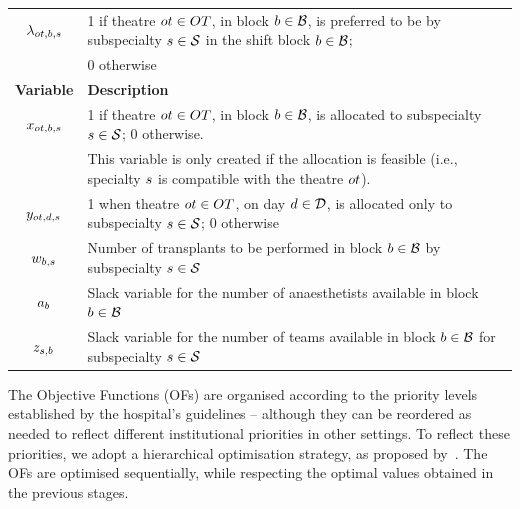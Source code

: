\begin{table}[t!]
\begin{tabular}{cl}
        $\lambda_{ot,b,s}$   & 1 if theatre $ot \in OT$, in block $b \in \mathcal{B}$, is preferred to be by subspecialty $s \in \mathcal{S}$ in the shift block $b \in \mathcal{B}$; \\
                                                           &  0 otherwise          \\
    \bottomrule
    \textbf{Variable}                         & \textbf{Description}                                                                  \\
    \midrule
        $x_{ot,b,s}$                                        & 1 if theatre $ot \in OT$, in block $b \in \mathcal{B}$, is allocated to subspecialty $s \in \mathcal{S}$; 0 otherwise. \\
                                                           & This variable is only created if the allocation is feasible (i.e., specialty $s$ is compatible with the theatre $ot$).                \\
        $y_{ot,d,s}$                                         & 1 when theatre $ot \in OT$, on day $d \in \mathcal{D}$, is allocated only to subspecialty $s \in \mathcal{S}$; 0 otherwise  \\
        $w_{b,s}$                                      & Number of transplants to be performed in block $b \in \mathcal{B}$ by subspecialty $s \in \mathcal{S}$ \\
        $a_{b}$                                   & Slack variable for the number of anaesthetists available in block $b \in \mathcal{B}$ \\
        $z_{s,b}$                                    & Slack variable for the number of teams available in block $b \in \mathcal{B}$ for subspecialty $s \in \mathcal{S}$ \\
        \bottomrule
    \end{tabular}
\end{table}

The Objective Functions (OFs) are organised according to the priority levels established by the hospital's guidelines -- although they can be reordered as needed to reflect different institutional priorities in other settings.
To reflect these priorities, we adopt a hierarchical optimisation strategy, as proposed by~\citet{Aringhieri2022Hierarchical}.
The OFs are optimised sequentially, while respecting the optimal values obtained in the previous stages.

